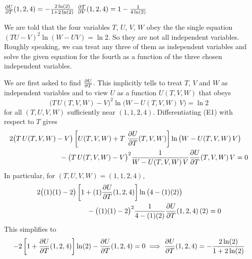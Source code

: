 \begin{answer}
$\pdiff{U}{T}(1,2,4) = -\frac{2\ln(2)}{1+2\ln(2)}$\qquad
$\pdiff{T}{V}(1,2,4) = 1 -\frac{1}{4\ln(2)}$
\end{answer}

\begin{solution}
We are told that the four variables $T$, $U$, $V$, $W$ obey the
the single equation $(TU-V)^2 \ln(W-UV) = \ln 2$. So they are not all
independent variables. Roughly speaking, we can treat any three of them
as independent variables and solve the given equation for the fourth 
as a function of the three chosen independent variables.


We are first asked to find $\pdiff{U}{T}$. This implicitly tells to
treat $T$, $V$ and $W$ as independent variables and to view $U$
as a function $U(T,V,W)$ that obeys 
\begin{equation*}
\big(T\, U(T,V,W)-V\big)^2 \ln\big(W-U(T,V,W)\,V\big) = \ln 2
\tag{E1}\end{equation*}
for all $(T, U, V, W)$ sufficiently near $(1, 1, 2, 4)$.
Differentiating (E1) with respect to $T$ gives
\begin{align*}
&2\big(T\, U(T,V,W)-V\big)
         \left[ U(T,V,W) +T\ \pdiff{U}{T}(T,V,W)\right] 
            \ln\big(W-U(T,V,W)\,V\big) \\
&\hskip1in
  -\big(T\, U(T,V,W)-V\big)^2 \frac{1}{W-U(T,V,W)\,V}\pdiff{U}{T}(T,V,W)\,V = 0
\end{align*}
In particular, for $(T, U, V, W)=(1, 1, 2, 4)$,
\begin{align*}
&2\big((1)(1)-2\big)
         \left[ 1 +(1)\pdiff{U}{T}(1,2,4)\right] 
            \ln\big(4-(1)(2)\big) \\
&\hskip1in
  -\big((1)(1)-2\big)^2 \frac{1}{4-(1)(2)}\pdiff{U}{T}(1,2,4)\,(2) = 0
\end{align*}
This simplifies to
\begin{align*}
-2\left[ 1 +\pdiff{U}{T}(1,2,4)\right] \ln(2)
                        -\pdiff{U}{T}(1,2,4)=0 
\implies
\pdiff{U}{T}(1,2,4) = -\frac{2\ln(2)}{1+2\ln(2)}
\end{align*}

\medskip


\end{solution}
